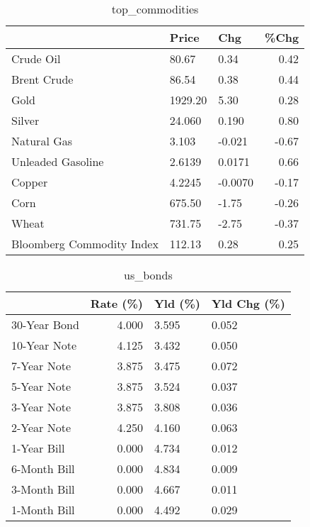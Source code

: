 \documentclass{article}%
\begin{document}
\begin{table}[htbp]%
\caption{top\_commodities}%
\centering%
\begin{adjustbox}{width=1\textwidth}%
\begin{tabular}{lllr}
\toprule
                          &   Price &     Chg &  \%Chg \\
\midrule
               Crude Oil  &   80.67 &    0.34 &  0.42 \\
             Brent Crude  &   86.54 &    0.38 &  0.44 \\
                    Gold  & 1929.20 &    5.30 &  0.28 \\
                  Silver  &  24.060 &   0.190 &  0.80 \\
             Natural Gas  &   3.103 &  -0.021 & -0.67 \\
       Unleaded Gasoline  &  2.6139 &  0.0171 &  0.66 \\
                  Copper  &  4.2245 & -0.0070 & -0.17 \\
                    Corn  &  675.50 &   -1.75 & -0.26 \\
                   Wheat  &  731.75 &   -2.75 & -0.37 \\
Bloomberg Commodity Index &  112.13 &    0.28 &  0.25 \\
\bottomrule
\end{tabular}
%
\end{adjustbox}%
\end{table}

%


\begin{table}[htbp]%
\caption{us\_bonds}%
\centering%
\begin{adjustbox}{width=1\textwidth}%
\begin{tabular}{lrll}
\toprule
             &  Rate (\%) & Yld (\%) & Yld Chg (\%) \\
\midrule
30-Year Bond &     4.000 &   3.595 &       0.052 \\
10-Year Note &     4.125 &   3.432 &       0.050 \\
 7-Year Note &     3.875 &   3.475 &       0.072 \\
 5-Year Note &     3.875 &   3.524 &       0.037 \\
 3-Year Note &     3.875 &   3.808 &       0.036 \\
 2-Year Note &     4.250 &   4.160 &       0.063 \\
 1-Year Bill &     0.000 &   4.734 &       0.012 \\
6-Month Bill &     0.000 &   4.834 &       0.009 \\
3-Month Bill &     0.000 &   4.667 &       0.011 \\
1-Month Bill &     0.000 &   4.492 &       0.029 \\
\bottomrule
\end{tabular}
%
\end{adjustbox}%
\end{table}
\end{document}
